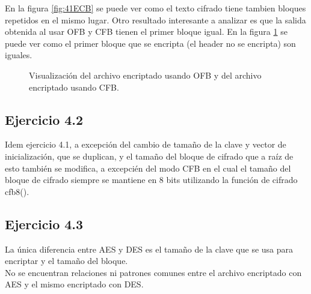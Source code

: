 \documentclass[a4paper,10pt]{article}
\begin{document}
En la figura \ref{fig:41ECB} se puede ver como el texto cifrado tiene tambien bloques
repetidos en el mismo lugar. Otro resultado interesante a analizar es que la salida obtenida al usar
OFB y CFB tienen el primer bloque igual. En la figura \ref{fig:41OFBCFB} se puede ver
como el primer bloque que se encripta (el header no se encripta) son iguales.
\begin{figure}
	\begin{center}
	\end{center}
	\caption{Visualización del archivo encriptado usando OFB y del archivo encriptado usando CFB.}
	\label{fig:41OFBCFB}
\end{figure}

\subsection{Ejercicio 4.2}
Idem ejercicio 4.1, a excepci\'on del cambio de tama\~no de la clave y vector de inicializaci\'on, que se duplican, y el tama\~no del bloque de cifrado que a ra\'iz de esto tambi\'en se modifica, a excepci\'en del modo CFB en el cual el tama\~no del bloque de cifrado siempre se mantiene en 8 bits utilizando la funci\'on de cifrado cfb8().

\subsection{Ejercicio 4.3}
La \'unica diferencia entre AES y DES es el tama\~no de la clave que se usa para encriptar y el tama\~no del bloque.\\
No se encuentran relaciones ni patrones comunes entre el archivo encriptado con AES y el mismo encriptado con DES.\\
\end{document}

